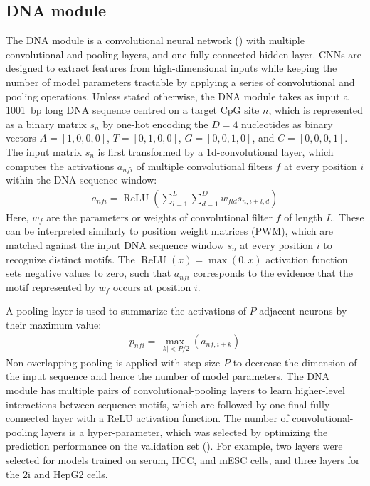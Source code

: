 \subsection{DNA module}

The DNA module is a convolutional neural network () with multiple convolutional and pooling layers, and one fully connected hidden layer. CNNs are designed to extract features from high-dimensional inputs while keeping the number of model parameters tractable by applying a series of convolutional and pooling operations. Unless stated otherwise, the DNA module takes as input a 1001~bp long DNA sequence centred on a target CpG site $n$, which is represented as a binary matrix $s_n$ by one-hot encoding the $D=4$ nucleotides as binary vectors $A=[1, 0, 0, 0]$, $T=[0, 1, 0, 0]$, $G=[0, 0, 1, 0]$, and $C=[0, 0, 0, 1]$. The input matrix $s_n$ is first transformed by a 1d-convolutional layer, which computes the activations $a_{nfi}$ of multiple convolutional filters $f$ at every position $i$ within the DNA sequence window:
\begin{align} \label{eq:dcpg_filter_act}
  a_{nfi}=\operatorname{ReLU}(\sum_{l=1}^L \sum_{d=1}^D w_{fld} s_{n,i+l,d})
\end{align}
Here, $w_f$  are the parameters or weights of convolutional filter $f$ of length $L$. These can be interpreted similarly to position weight matrices (PWM), which are matched against the input DNA sequence window $s_n$ at every position $i$ to recognize distinct motifs. The $\operatorname{ReLU}(x)=\max(0,x)$ activation function sets negative values to zero, such that $a_{nfi}$ corresponds to the evidence that the motif represented by $w_f$ occurs at position $i$.

A pooling layer is used to summarize the activations of $P$ adjacent neurons by their maximum value:
\begin{align}
  p_{nfi}=\max_{|k|<P/2}(a_{nf,i+k})
\end{align}
Non-overlapping pooling is applied with step size $P$ to decrease the dimension of the input sequence and hence the number of model parameters. The DNA module has multiple pairs of convolutional-pooling layers to learn higher-level interactions between sequence motifs, which are followed by one final fully connected layer with a ReLU activation function. The number of convolutional-pooling layers is a hyper-parameter, which was selected by optimizing the prediction performance on the validation set (). For example, two layers were selected for models trained on serum, HCC, and mESC cells, and three layers for the 2i and HepG2 cells.



